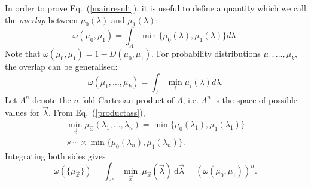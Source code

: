 \documentclass[amsmath,amssymb,superscriptaddress,pra,12pt]{revtex4-1}
\begin{document}
In order to prove Eq.~(\ref{mainresult}), it is useful to define a quantity which we call the \emph{overlap} between $\mu_0(\lambda)$ and $\mu_1(\lambda)$:
\begin{equation}
\omega(\mu_0,\mu_1) = \int_\Lambda \min\{\mu_0(\lambda), \mu_1(\lambda)\}  d\lambda.\label{overlapdef}
\end{equation}
Note that $\omega(\mu_0,\mu_1) = 1 - D(\mu_0,\mu_1)$. 
For probability distributions $\mu_1, \dotsc, \mu_k$, the overlap can be generalised:
\begin{equation}
\omega(\mu_1,\ldots,\mu_k) = \int_\Lambda \min_i \mu_i(\lambda) d\lambda.
\end{equation}
Let $\Lambda^n$ denote the $n$-fold Cartesian product of $\Lambda$, i.e. $\Lambda^n$ is the space of possible values for $\vec{\lambda}$. From Eq.~(\ref{productass}), 
\begin{multline}
\min_{\vec{x}} \mu_{\vec{x}}(\lambda_1, \dotsc, \lambda_n) = \min\{\mu_0(\lambda_1),\mu_1(\lambda_1)\}\\\times \dotsm \times \min\{\mu_0(\lambda_n),\mu_1(\lambda_n)\}.
\end{multline}
Integrating both sides gives
\begin{equation}\label{multilem}
\omega\left( \{ \mu_{\vec{x}} \} \right) = \int_{\Lambda^n} \min_{\vec{x}} \ \mu_{\vec{x}}(\vec{\lambda}) \ \mathrm{d}\vec{\lambda} = \left(\omega(\mu_0,\mu_1)\right)^n.
\end{equation}

\end{document}
